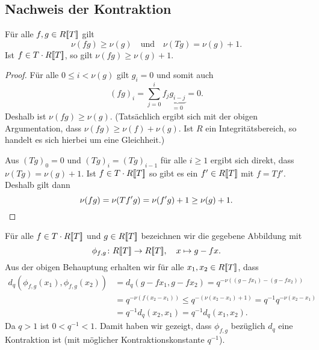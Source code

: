 \documentclass[a4paper, 10pt, numbers=noenddot]{scrartcl}
\begin{document}
\section{}


\subsection*{Nachweis der Kontraktion}


\begin{claim}
  Für alle $f, g \in R[\![T]\!]$ gilt
  \[
    \nu(f g) \geq \nu(g)
    \quad\text{und}\quad
    \nu(T g) = \nu(g) + 1.
  \]
  Ist $f \in T \cdot R[\![T]\!]$, so gilt $\nu(f g) \geq \nu(g) + 1$.
\end{claim}
\begin{proof}
  Für alle $0 \leq i < \nu(g)$ gilt $g_i = 0$ und somit auch
  \[
      (f g)_i
    = \sum_{j=0}^i f_j \underbrace{g_{i-j}}_{=0}
    = 0.
  \]
  Deshalb ist $\nu(f g) \geq \nu(g)$.  
  (Tatsächlich ergibt sich mit der obigen Argumentation, dass $\nu(fg) \geq \nu(f) + \nu(g)$.
  Ist $R$ ein Integritätsbereich, so handelt es sich hierbei um eine Gleichheit.)
  
  Aus $(T g)_0 = 0$ und $(T g)_i = (T g)_{i-1}$ für alle $i \geq 1$ ergibt sich direkt, dass $\nu(T g) = \nu(g) + 1$.
  Ist $f \in T \cdot R[\![T]\!]$ so gibt es ein $f' \in R[\![T]\!]$ mit $f = T f'$.
  Deshalb gilt dann
  \[
          \nu(f g)
    =     \nu(T f' g)
    =     \nu(f' g) + 1
    \geq  \nu(g) + 1.
    \qedhere
  \]
\end{proof}

Für alle $f \in T \cdot R[\![T]\!]$ und $g \in R[\![T]\!]$ bezeichnen wir die gegebene Abbildung mit
\[
  \phi_{f,g} \colon R[\![T]\!] \to R[\![T]\!],
  \quad
  x \mapsto g - fx.
\]
Aus der obigen Behauptung erhalten wir für alle $x_1, x_2 \in R[\![T]\!]$, dass
\begin{align*}
        d_q( \phi_{f,g}(x_1), \phi_{f,g}(x_2) )
  &=    d_q(g - f x_1, g - f x_2)
   =    q^{-\nu((g - f x_1) - (g - f x_2))}
  \\
  &=    q^{-\nu(f (x_2 - x_1))}
  \leq  q^{-(\nu(x_2 - x_1) + 1)}
  =     q^{-1} q^{-\nu(x_2 - x_1)}
  \\
  &=    q^{-1} d_q(x_2, x_1)
  =     q^{-1} d_q(x_1, x_2).
\end{align*}
Da $q > 1$ ist $0 < q^{-1} < 1$.
Damit haben wir gezeigt, dass $\phi_{f,g}$ bezüglich $d_q$ eine Kontraktion ist (mit möglicher Kontraktionskonstante $q^{-1}$).
\end{document}
